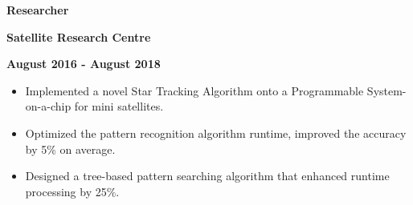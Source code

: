 \begin{multicols}{3}
    \begin{flushleft}
        \textbf{Researcher}
    \end{flushleft}

    \columnbreak

    \begin{center}
        \textbf{Satellite Research Centre}
    \end{center}

    \columnbreak

    \begin{flushright}
        \textbf{August 2016 - August 2018}
    \end{flushright}
\end{multicols}

\vspace{-5mm}

\begin{itemize}[noitemsep,leftmargin=*]
    \item Implemented a novel Star Tracking Algorithm onto a Programmable System-on-a-chip for mini satellites.
    \item Optimized the pattern recognition algorithm runtime, improved the accuracy by 5\% on average.
    \item Designed a tree-based pattern searching algorithm that enhanced runtime processing by 25\%.
\end{itemize}
